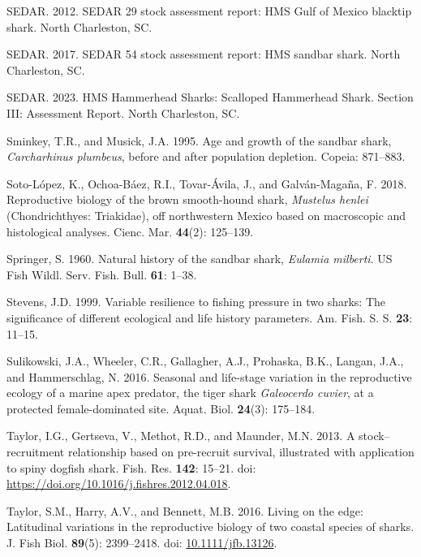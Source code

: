 \documentclass[
]{article}
\newenvironment{CSLReferences}%
  {}%
  {\par}
\begin{document}
\begin{CSLReferences}{1}{0}
SEDAR. 2012. {SEDAR} 29 stock assessment report: {HMS} {Gulf} of {Mexico} blacktip shark. North Charleston, SC.

SEDAR. 2017. {SEDAR} 54 stock assessment report: {HMS} sandbar shark. North Charleston, SC.

SEDAR. 2023. {HMS} {Hammerhead} {Sharks}: {Scalloped} {Hammerhead} {Shark}. {Section} {III}: {Assessment} {Report}. North Charleston, SC.

Sminkey, T.R., and Musick, J.A. 1995. Age and growth of the sandbar shark, \emph{{Carcharhinus} plumbeus}, before and after population depletion. Copeia: 871--883.

Soto-López, K., Ochoa-Báez, R.I., Tovar-Ávila, J., and Galván-Magaña, F. 2018. Reproductive biology of the brown smooth-hound shark, \emph{{Mustelus} henlei} ({Chondrichthyes}: {Triakidae}), off northwestern {Mexico} based on macroscopic and histological analyses. Cienc. Mar. \textbf{44}(2): 125--139.

Springer, S. 1960. Natural history of the sandbar shark, \emph{{Eulamia} milberti}. US Fish Wildl. Serv. Fish. Bull. \textbf{61}: 1--38.

Stevens, J.D. 1999. Variable resilience to fishing pressure in two sharks: The significance of different ecological and life history parameters. Am. Fish. S. S. \textbf{23}: 11--15.

Sulikowski, J.A., Wheeler, C.R., Gallagher, A.J., Prohaska, B.K., Langan, J.A., and Hammerschlag, N. 2016. Seasonal and life-stage variation in the reproductive ecology of a marine apex predator, the tiger shark \emph{{Galeocerdo} cuvier}, at a protected female-dominated site. Aquat. Biol. \textbf{24}(3): 175--184.

Taylor, I.G., Gertseva, V., Methot, R.D., and Maunder, M.N. 2013. A stock--recruitment relationship based on pre-recruit survival, illustrated with application to spiny dogfish shark. Fish. Res. \textbf{142}: 15--21. doi: \url{https://doi.org/10.1016/j.fishres.2012.04.018}.

Taylor, S.M., Harry, A.V., and Bennett, M.B. 2016. Living on the edge: Latitudinal variations in the reproductive biology of two coastal species of sharks. J. Fish Biol. \textbf{89}(5): 2399--2418. doi: \href{https://doi.org/10.1111/jfb.13126}{10.1111/jfb.13126}.


\end{CSLReferences}
\end{document}
